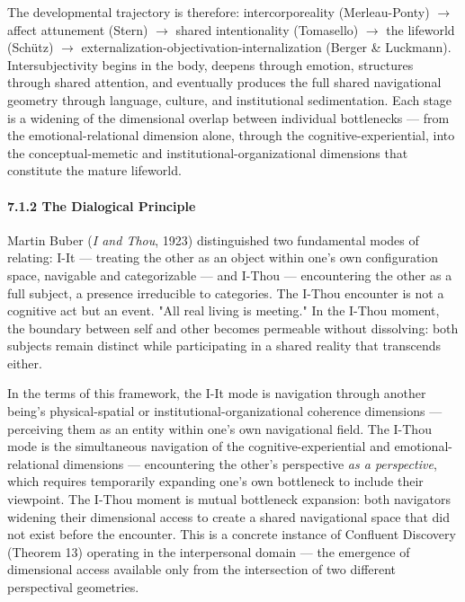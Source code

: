 The developmental trajectory is therefore: intercorporeality (Merleau-Ponty) $\rightarrow$ affect attunement (Stern) $\rightarrow$ shared intentionality (Tomasello) $\rightarrow$ the lifeworld (Schütz) $\rightarrow$ externalization-objectivation-internalization (Berger \& Luckmann). Intersubjectivity begins in the body, deepens through emotion, structures through shared attention, and eventually produces the full shared navigational geometry through language, culture, and institutional sedimentation. Each stage is a widening of the dimensional overlap between individual bottlenecks — from the emotional-relational dimension alone, through the cognitive-experiential, into the conceptual-memetic and institutional-organizational dimensions that constitute the mature lifeworld.


\paragraph*{7.1.2 The Dialogical Principle}


Martin Buber (\textit{I and Thou}, 1923) distinguished two fundamental modes of relating: I-It — treating the other as an object within one's own configuration space, navigable and categorizable — and I-Thou — encountering the other as a full subject, a presence irreducible to categories. The I-Thou encounter is not a cognitive act but an event. "All real living is meeting." In the I-Thou moment, the boundary between self and other becomes permeable without dissolving: both subjects remain distinct while participating in a shared reality that transcends either.


In the terms of this framework, the I-It mode is navigation through another being's physical-spatial or institutional-organizational coherence dimensions — perceiving them as an entity within one's own navigational field. The I-Thou mode is the simultaneous navigation of the cognitive-experiential and emotional-relational dimensions — encountering the other's perspective \textit{as a perspective}, which requires temporarily expanding one's own bottleneck to include their viewpoint. The I-Thou moment is mutual bottleneck expansion: both navigators widening their dimensional access to create a shared navigational space that did not exist before the encounter. This is a concrete instance of Confluent Discovery (Theorem 13) operating in the interpersonal domain — the emergence of dimensional access available only from the intersection of two different perspectival geometries.


